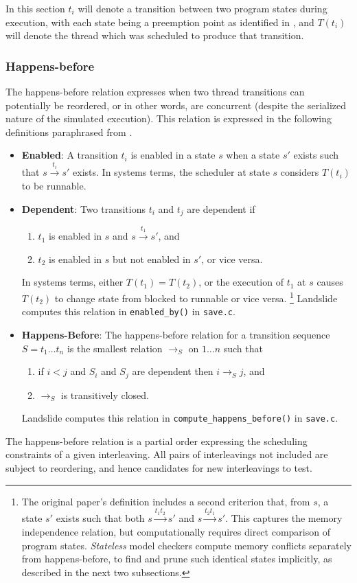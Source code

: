 In this section $t_i$ will denote a transition between two program states during execution,
with each state being a preemption point as identified in \sect{\ref{sec:landslide-pps}},
and $T(t_i)$ will denote the thread which was scheduled to produce that transition.

\subsubsection{Happens-before}

The happens-before relation expresses when two thread transitions can potentially be reordered,
or in other words, are concurrent (despite the serialized nature of the simulated execution).
This relation is expressed in the following definitions paraphrased from \cite{dpor}.

\begin{itemize}
	\item {\bf Enabled}: A transition $t_i$ is enabled in a state $s$ when a state $s'$ exists such that $s \xrightarrow{t_i} s'$ exists.
		In systems terms, the scheduler at state $s$ considers $T(t_i)$ to be runnable.
	\item {\bf Dependent}: Two transitions $t_i$ and $t_j$ are dependent if
		\begin{enumerate}
			\item $t_1$ is enabled in $s$ and $s \xrightarrow{t_1} s'$, and
			\item $t_2$ is enabled in $s$ but not enabled in $s'$, or vice versa.
		\end{enumerate}
		In systems terms, either $T(t_1) = T(t_2)$,
		or the execution of $t_1$ at $s$ causes $T(t_2)$
		to change state from blocked to runnable or vice versa.
		\footnote{The original paper's definition includes a second criterion that, from $s$,
		a state $s'$ exists such that both $s \xrightarrow{t_1 t_2} s'$ and $s \xrightarrow{t_2 t_1} s'$.
		This captures the memory independence relation,
		but computationally requires direct comparison of program states.
		{\em Stateless} model checkers compute memory conflicts separately from happens-before,
		to find and prune such identical states implicitly,
		as described in the next two subsections.}
		Landslide computes this relation in {\tt enabled\_by()} in {\tt save.c}.
	\item {\bf Happens-Before}: The happens-before relation for a transition sequence $S = t_1 \dots t_n$
		is the smallest relation $\rightarrow_S$ on ${1 \dots n}$ such that
		\begin{enumerate}
			\item if $i < j$ and $S_i$ and $S_j$ are dependent then $i \rightarrow_S j$, and
			\item $\rightarrow_S$ is transitively closed.
		\end{enumerate}
		Landslide computes this relation in
		{\tt compute\_happens\_before()} in {\tt save.c}.
\end{itemize}
The happens-before relation is a partial order expressing the scheduling constraints of a given interleaving.
All pairs of interleavings not included are subject to reordering,
and hence candidates for new interleavings to test.

